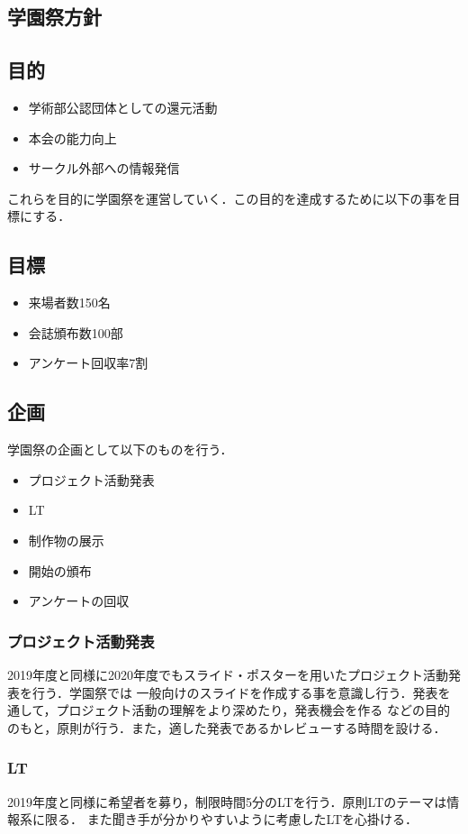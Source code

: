 \subsection*{学園祭方針}


\subsection*{目的}
\begin{itemize}
    \item 学術部公認団体としての還元活動
    \item 本会の能力向上
    \item サークル外部への情報発信
\end{itemize}
これらを目的に学園祭を運営していく．この目的を達成するために以下の事を目標にする．
\subsection*{目標}
\begin{itemize}
    \item 来場者数150名
    \item 会誌頒布数100部
    \item アンケート回収率7割
\end{itemize}
\subsection*{企画}
学園祭の企画として以下のものを行う．
\begin{itemize}
    \item プロジェクト活動発表
    \item LT
    \item 制作物の展示
    \item 開始の頒布
    \item アンケートの回収
\end{itemize}
\subsubsection*{プロジェクト活動発表}
2019年度と同様に2020年度でもスライド・ポスターを用いたプロジェクト活動発表を行う．学園祭では
一般向けのスライドを作成する事を意識し行う．発表を通して，プロジェクト活動の理解をより深めたり，発表機会を作る
などの目的のもと，原則\firstGrade{}が行う．また，適した発表であるかレビューする時間を設ける．

\subsubsection*{LT}
2019年度と同様に希望者を募り，制限時間5分のLTを行う．原則LTのテーマは情報系に限る．
また聞き手が分かりやすいように考慮したLTを心掛ける．

